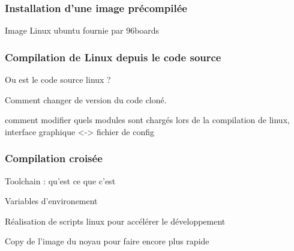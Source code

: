 \subsubsection{Installation d'une image précompilée}

Image Linux ubuntu fournie par 96boards

\subsubsection{Compilation de Linux depuis le code source}\label{sec:compilation-linux-source}

Ou est le code source linux ?

Comment changer de version du code cloné. 

comment modifier quels modules sont chargés lors de la compilation de linux, interface graphique <-> fichier de config
\subsubsection{Compilation croisée}

Toolchain : qu'est ce que c'est

Variables d'environement

Réalisation de scripts linux pour accélérer le développement

Copy de l'image du noyau pour faire encore plus rapide

